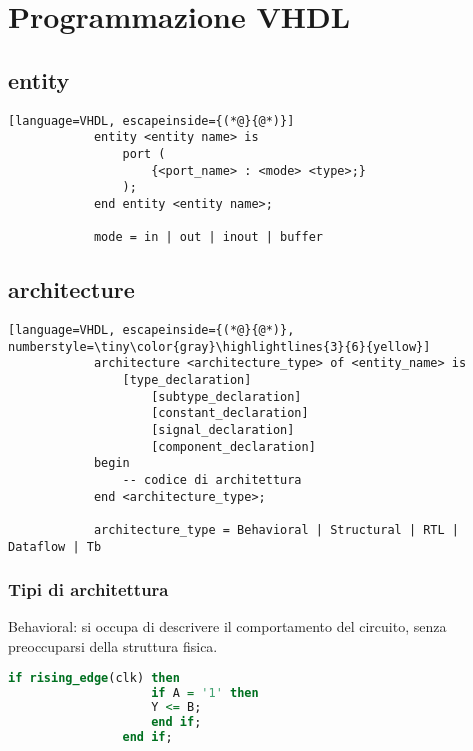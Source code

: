 \section{Programmazione VHDL}
    \subsection{entity}
        \begin{lstlisting}[language=VHDL, escapeinside={(*@}{@*)}]
            entity <entity name> is
                port (
                    {<port_name> : <mode> <type>;}
                );
            end entity <entity name>;

            mode = in | out | inout | buffer
        \end{lstlisting}

    \subsection{architecture}
        \begin{lstlisting}[language=VHDL, escapeinside={(*@}{@*)}, numberstyle=\tiny\color{gray}\highlightlines{3}{6}{yellow}]
            architecture <architecture_type> of <entity_name> is
                [type_declaration]
                    [subtype_declaration]
                    [constant_declaration]
                    [signal_declaration]
                    [component_declaration]
            begin
                -- codice di architettura
            end <architecture_type>;

            architecture_type = Behavioral | Structural | RTL | Dataflow | Tb
        \end{lstlisting}

        \subsubsection{Tipi di architettura}
            Behavioral: si occupa di descrivere il comportamento del circuito, senza preoccuparsi della struttura fisica.
            \begin{lstlisting}[language=VHDL]
                if rising_edge(clk) then
                    if A = '1' then
                    Y <= B;
                    end if;
                end if;
                \end{lstlisting}



